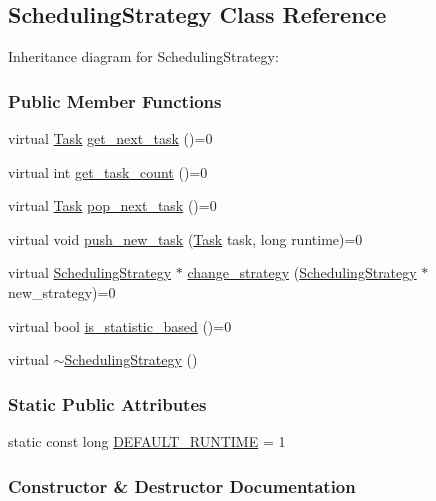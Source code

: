 \hypertarget{a00033}{}\subsection{Scheduling\+Strategy Class Reference}
\label{a00033}


Inheritance diagram for Scheduling\+Strategy\+:
\subsubsection*{Public Member Functions}
\begin{DoxyCompactItemize}
\item 
virtual \hyperlink{a00002}{Task} \hyperlink{a00033_adce3619801460ad67d6c8f9bdffcd36b}{get\+\_\+next\+\_\+task} ()=0
\item 
virtual int \hyperlink{a00033_a0a3355ffe9c03236692ad00e4f94f5c5}{get\+\_\+task\+\_\+count} ()=0
\item 
virtual \hyperlink{a00002}{Task} \hyperlink{a00033_ac2ba483287c91fd4318f337da144a9c5}{pop\+\_\+next\+\_\+task} ()=0
\item 
virtual void \hyperlink{a00033_a62ffa0426528c14fdd0b0853f04a851f}{push\+\_\+new\+\_\+task} (\hyperlink{a00002}{Task} task, long runtime)=0
\item 
virtual \hyperlink{a00033}{Scheduling\+Strategy} $\ast$ \hyperlink{a00033_a4874d194c1bb185480339360fe907d83}{change\+\_\+strategy} (\hyperlink{a00033}{Scheduling\+Strategy} $\ast$new\+\_\+strategy)=0
\item 
virtual bool \hyperlink{a00033_a5962845ca5af53bbdc014c19a6bdef99}{is\+\_\+statistic\+\_\+based} ()=0
\item 
virtual \hyperlink{a00033_a896eb08aa462cd1ecaa59ca02c7c0c58}{$\sim$\+Scheduling\+Strategy} ()
\end{DoxyCompactItemize}
\subsubsection*{Static Public Attributes}
\begin{DoxyCompactItemize}
\item 
static const long \hyperlink{a00033_acc0ddb05e5c6f21bd0e82a9e89a23ccb}{D\+E\+F\+A\+U\+L\+T\+\_\+\+R\+U\+N\+T\+I\+M\+E} = 1
\end{DoxyCompactItemize}


\subsubsection{Constructor \& Destructor Documentation}
\hypertarget{a00033_a896eb08aa462cd1ecaa59ca02c7c0c58}{}
